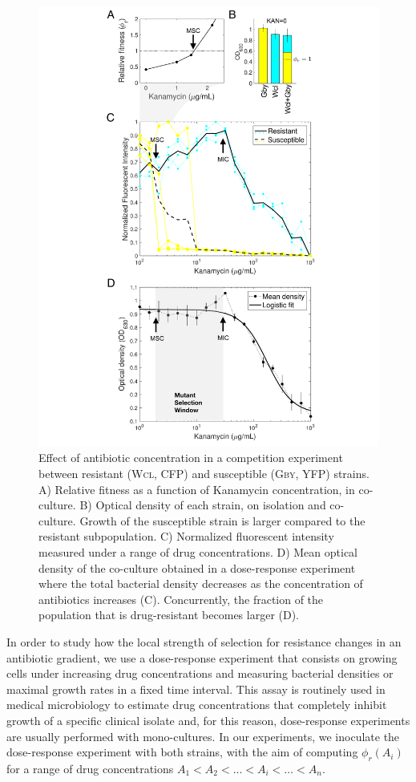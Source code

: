 \documentclass[fleqn,12pt]{wlscirep}
\begin{document}
\begin{figure}\centering
\includegraphics[width=0.9\linewidth]{figures/Figure1.pdf}
\caption{\footnotesize Effect of antibiotic concentration in a competition experiment between resistant (\textsc{Wcl}, CFP) and susceptible (\textsc{Gby}, YFP) strains. A) Relative fitness as a function of Kanamycin concentration, in co-culture. B) Optical density of each strain, on isolation and co-culture. Growth of the susceptible strain is larger compared to the resistant subpopulation. C) Normalized fluorescent intensity measured under a range of drug concentrations.  D) Mean optical density of the co-culture obtained in a dose-response experiment where the total bacterial density decreases as the concentration of antibiotics increases (C). Concurrently, the fraction of the population that is drug-resistant becomes larger (D). }
\label{fig:figure1}
\end{figure}


In order to study how the local strength of selection for resistance changes in an antibiotic gradient, we use a dose-response experiment that consists on growing cells under increasing drug concentrations and measuring bacterial densities or maximal growth rates in a fixed time interval. This assay is routinely used in medical microbiology to estimate drug concentrations that completely inhibit growth of a specific clinical isolate and, for this reason, dose-response experiments are usually performed with mono-cultures. In our experiments, we inoculate the dose-response experiment with both strains, with the aim of computing $\phi_r(A_i)$ for a range of drug concentrations $A_1 < A_2 < \dots < A_i < \dots < A_n$.
\end{document}

